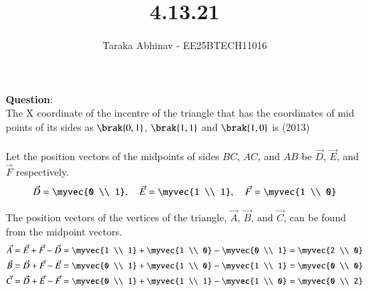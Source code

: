 \documentclass[journal]{IEEEtran}
\begin{document}


\title{4.13.21}
\author{Taraka Abhinav - EE25BTECH11016}
{\let\newpage\relax\maketitle}

\renewcommand{\thefigure}{\theenumi}
\renewcommand{\thetable}{\theenumi}
\setlength{\intextsep}{10pt}

\renewcommand{\thetable}{\theenumi}

\textbf{Question}:\\
The X coordinate of the incentre of the triangle that has the coordinates of mid points of its sides as $\brak{0, 1}$, $\brak{1, 1}$ and $\brak{1, 0}$ is \hfill (2013)
\\

\solution \\

Let the position vectors of the midpoints of sides $BC$, $AC$, and $AB$ be $\vec{D}$, $\vec{E}$, and $\vec{F}$ respectively.
\begin{align}
\vec{D} = \myvec{0 \\ 1}, \quad \vec{E} = \myvec{1 \\ 1}, \quad \vec{F} = \myvec{1 \\ 0}
\end{align}

The position vectors of the vertices of the triangle, $\vec{A}$, $\vec{B}$, and $\vec{C}$, can be found from the midpoint vectors.
\begin{align}
\vec{A} &= \vec{E} + \vec{F} - \vec{D} = \myvec{1 \\ 1} + \myvec{1 \\ 0} - \myvec{0 \\ 1} = \myvec{2 \\ 0} \\
\vec{B} &= \vec{D} + \vec{F} - \vec{E} = \myvec{0 \\ 1} + \myvec{1 \\ 0} - \myvec{1 \\ 1} = \myvec{0 \\ 0} \\
\vec{C} &= \vec{D} + \vec{E} - \vec{F} = \myvec{0 \\ 1} + \myvec{1 \\ 1} - \myvec{1 \\ 0} = \myvec{0 \\ 2}
\end{align}
\end{document}
